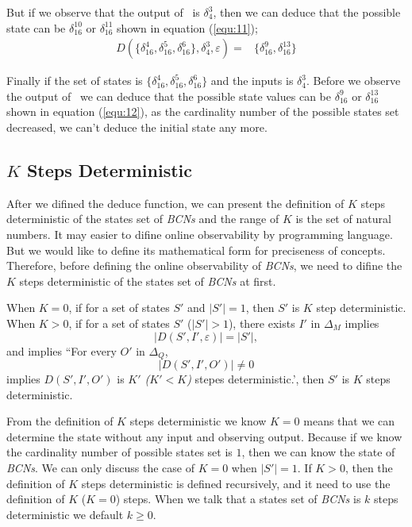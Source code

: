 But if we observe that the output of \BCN\ is $\delta_4^3$, then we can deduce that the possible state can be $\delta_{16}^{10}$ or  $\delta_{16}^{11}$ shown in equation (\ref{equ:11}); 
\begin{equation}
\begin{split}
D\left(\{\delta_{16}^4,\delta_{16}^5,\delta_{16}^6\},\delta_4^3,\varepsilon\right)=&\{\delta_{16}^9,\delta_{16}^{13}\}
\end{split}
\label{equ:12}
\end{equation}

 Finally if the set of states is $\{\delta_{16}^4,\delta_{16}^5,\delta_{16}^6\}$ and the inputs is $\delta_4^3$. Before we observe the output of \BCN\ we can deduce that the possible state values can be $\delta_{16}^9$ or  $\delta_{16}^{13}$ shown in equation (\ref{equ:12}), as  the cardinality number of the possible states set decreased, we can't deduce the initial state any more. 

\subsection{$K$ Steps Deterministic}
After we difined the deduce function, we can present the definition of $K$ steps deterministic of the states set of {\em BCNs} and the range of $K$ is the set of natural numbers. It may easier to difine online observability by programming language. But we would like to define its mathematical form for preciseness of concepts. Therefore, before defining the online observability of {\em BCNs}, we need to difine the $K$ steps deterministic of the states set of {\em BCNs} at first.
\begin{definition} 
When $K=0$, 
 if for a set of states $S'$ and $|S'|=1$, then $S'$ is $K$ step deterministic. When $K>0$, 
 if for a set of states $S'$ ($|S'|>1$), there exists $I'$ in $\Delta_M$ implies \[|D\left(S',I',\varepsilon\right)|=|S'|, \]and implies ``For every $O'$ in $\Delta_Q$, \[|D\left(S',I',O'\right)|\neq 0\] implies $D\left(S',I',O'\right)$ is {\em$K'$ (${K'}<K$)} stepes deterministic.', then $S'$ is $K$ steps deterministic.
\end{definition}

From the definition of {\em$K$} steps deterministic we know $K=0$ means that we can determine the state without any input and observing output. Because if we know the cardinality number of possible states set is $1$, then we can know the state of {\em BCNs}. We can only discuss the case of $K=0$ when $|S'|=1$. If $K>0$, then the definition of $K$ steps deterministic is defined recursively, and it need to use the definition of $K$ ($K=0$) steps. When we talk that a states set of {\em BCNs} is $k$ steps deterministic we default $k\ge0$.

